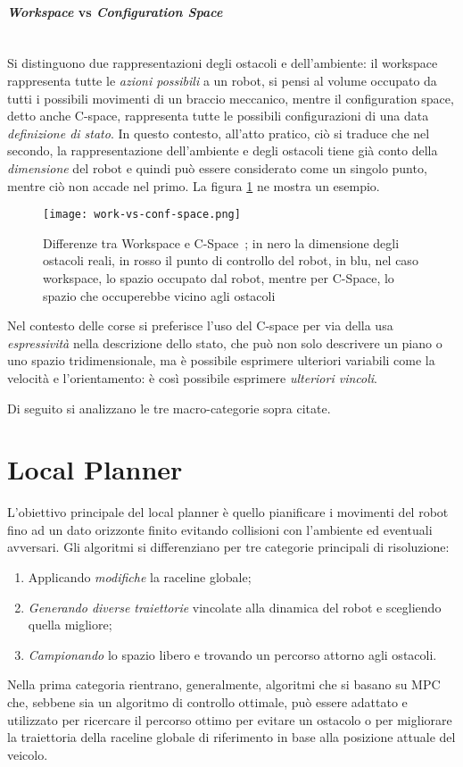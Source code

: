 \paragraph{\textit{Workspace} vs \textit{Configuration Space}} \ \\
Si distinguono due rappresentazioni degli ostacoli e dell'ambiente: il workspace rappresenta tutte le
\textit{azioni possibili} a un robot, si pensi al volume occupato da tutti i possibili movimenti di un
braccio meccanico, mentre il configuration space, detto anche C-space, rappresenta tutte le possibili
configurazioni di una data \textit{definizione di stato}. In questo contesto, all'atto pratico, ciò si
traduce che nel secondo, la rappresentazione dell'ambiente e degli ostacoli tiene già conto della
\textit{dimensione} del robot e quindi può essere considerato come un singolo punto, mentre ciò non
accade nel primo. La figura \ref{fig:work-vs-conf-space} ne mostra un esempio.
\begin{figure}[H]
	\begin{center}
		\texttt{[image: work-vs-conf-space.png]}
	\end{center}
	\caption{Differenze tra Workspace e C-Space~\cite{lection11}; in nero la dimensione degli ostacoli
	reali, in rosso il punto di controllo del robot, in blu, nel caso workspace, lo spazio occupato dal
	robot, mentre per C-Space, lo spazio che occuperebbe vicino agli ostacoli}
	\label{fig:work-vs-conf-space}
\end{figure}
Nel contesto delle corse si preferisce l'uso del C-space per via della usa \textit{espressività} nella
descrizione dello stato, che può non solo descrivere un piano o uno spazio tridimensionale, ma è
possibile esprimere ulteriori variabili come la velocità e l'orientamento: è così possibile esprimere
\textit{ulteriori vincoli}.

\bigskip
\noindent Di seguito si analizzano le tre macro-categorie sopra citate.

\section{Local Planner}
L'obiettivo principale del local planner è quello pianificare i movimenti del robot fino ad un dato
orizzonte finito evitando collisioni con l'ambiente ed eventuali avversari. Gli algoritmi si
differenziano per tre categorie principali di risoluzione:
\begin{enumerate}
	\item Applicando \textit{modifiche} la raceline globale; 
	\item \textit{Generando diverse traiettorie} vincolate alla dinamica del robot e scegliendo quella migliore;
	\item \textit{Campionando} lo spazio libero e trovando un percorso attorno agli ostacoli.
\end{enumerate}
Nella prima categoria rientrano, generalmente, algoritmi che si basano su MPC che, sebbene sia un
algoritmo di controllo ottimale, può essere adattato e utilizzato per ricercare il percorso ottimo per
evitare un ostacolo o per migliorare la traiettoria della raceline globale di riferimento in base alla
posizione attuale del veicolo.

